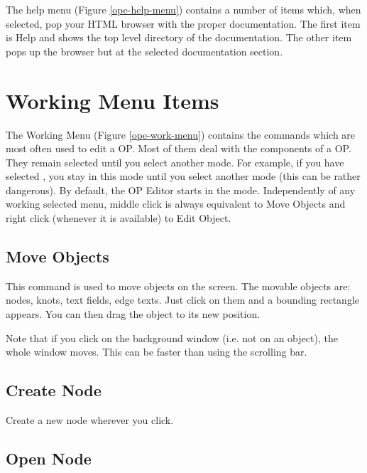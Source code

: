 The help menu (Figure \ref{ope-help-menu}) contains a number of items which,
when selected, pop your HTML browser with the proper documentation. The
first item is Help and shows the top level directory of the documentation.
The other item pops up the browser but at the selected documentation
section.

\section{Working Menu Items}


The Working Menu (Figure \ref{ope-work-menu}) contains the
commands which are most often used to edit a OP.  Most of them deal with the
components of a OP. They remain selected until you select another mode. For
example, if you have selected , you stay in this mode
until you select another mode (this can be rather dangerous). By default, the
OP Editor starts in the  mode. Independently of any working
selected menu, middle click is always equivalent to Move Objects and right
click (whenever it is available) to Edit Object.



\subsection{Move Objects}

This command is used to move objects on the screen. The movable objects
are: nodes, knots, text fields, edge texts. Just click on them and
a bounding rectangle appears. You can then drag the object to its new
position.

Note that if you click on the background window (i.e. not on an object),
the whole window moves. This can be faster than using the
scrolling bar.

\subsection{Create Node}

Create a new node wherever you click.

\subsection{Open Node}

